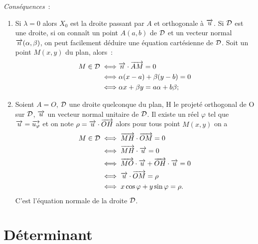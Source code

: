 \emph{Conséquences}~:
\begin{enumerate}
\item Si $\lambda = 0$ alors $X_0$ est la droite passant par $A$ et orthogonale à $\overrightarrow{u}$. Si $\mathcal{D}$ est une droite, si on connaît un point $A(a,b)$ de $\mathcal{D}$ et un vecteur normal $\overrightarrow{n}(\alpha,\beta)$, on peut facilement déduire une équation cartésienne de $\mathcal{D}$. Soit un point $M(x,y)$ du plan, alors~:
  \begin{align}
    M \in \mathcal{D}  \iff & \overrightarrow{n} \cdot \overrightarrow{AM}=0 \\
    \iff & \alpha(x-a)+\beta(y-b)=0\\
    \iff & \alpha x + \beta y=a \alpha + b \beta;
  \end{align}
\item Soient $A=O$, $\mathcal{D}$ une droite quelconque du plan, H le projeté orthogonal de O sur $\mathcal{D}$, $\overrightarrow{u}$ un vecteur normal unitaire de $\mathcal{D}$. Il existe un réel $\varphi$ tel que $\overrightarrow{u}=\overrightarrow{u_\varphi}$ et on note $\rho=\overrightarrow{u} \cdot \overrightarrow{OH}$ alors pour tous point $M(x,y)$ on a 
  \begin{align}
    M \in \mathcal{D} & \iff \overrightarrow{MH} \cdot \overrightarrow{OM}=0 \\
    & \iff \overrightarrow{MH} \cdot \overrightarrow{u} =0 \\
    & \iff \overrightarrow{MO} \cdot \overrightarrow{u} +\overrightarrow{OH} \cdot \overrightarrow{u}=0\\
    & \iff \overrightarrow{u} \cdot \overrightarrow{OM}=\rho\\
    & \iff x \cos \varphi + y \sin \varphi=\rho.
  \end{align}
  C'est l'équation normale de la droite $\mathcal{D}$.
\end{enumerate}

\section{Déterminant}

